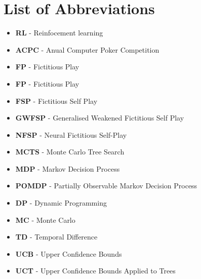 \pagebreak

\section*{List of Abbreviations}\label{sec:listOfAbbreviations}

\begin{itemize}
    \item \textbf{RL} - Reinfocement learning
    \item \textbf{ACPC} - Anual Computer Poker Competition
    \item \textbf{FP} - Fictitious Play
    \item \textbf{FP} - Fictitious Play
    \item \textbf{FSP} - Fictitious Self Play
    \item \textbf{GWFSP} - Generalised Weakened Fictitious Self Play
    \item \textbf{NFSP} - Neural Fictitious Self-Play
    \item \textbf{MCTS} - Monte Carlo Tree Search
    \item \textbf{MDP} - Markov Decision Process
    \item \textbf{POMDP} - Partially Observable Markov Decision Process
    \item \textbf{DP} - Dynamic Programming
    \item \textbf{MC} - Monte Carlo
    \item \textbf{TD} - Temporal Difference
    \item \textbf{UCB} - Upper Confidence Bounds
    \item \textbf{UCT} - Upper Confidence Bounds Applied to Trees
\end{itemize}